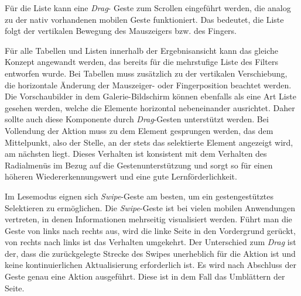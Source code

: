 Für die Liste kann eine \textit{Drag}- Geste zum Scrollen eingeführt werden, die analog zu der nativ vorhandenen mobilen Geste funktioniert. Das bedeutet, die Liste folgt der vertikalen Bewegung des Mauszeigers bzw. des Fingers.\par
{}
Für alle Tabellen und Listen innerhalb der Ergebnisansicht kann das gleiche Konzept angewandt werden, das bereits für die mehrstufige Liste des Filters entworfen wurde. Bei Tabellen muss zusätzlich zu der vertikalen Verschiebung, die horizontale Änderung der Mauszeiger- oder Fingerposition beachtet werden. Die Vorschaubilder in dem Galerie-Bildschirm können ebenfalls als eine Art Liste gesehen werden, welche die Elemente horizontal nebeneinander ausrichtet. Daher sollte auch diese Komponente durch \textit{Drag}-Gesten unterstützt werden. Bei Vollendung der Aktion muss zu dem Element gesprungen werden, das dem Mittelpunkt, also der Stelle, an der stets das selektierte Element angezeigt wird, am nächsten liegt. Dieses Verhalten ist konsistent mit dem Verhalten des Radialmenüs im Bezug auf die Gestenunterstützung und sorgt so für einen höheren Wiedererkennungswert und eine gute Lernförderlichkeit.\par
Im Lesemodus eignen sich \textit{Swipe}-Geste am besten, um ein gestengestütztes Selektieren zu ermöglichen. Die \textit{Swipe}-Geste ist bei vielen mobilen Anwendungen vertreten, in denen Informationen mehrseitig visualisiert werden. Führt man die Geste von links nach rechts aus, wird die linke Seite in den Vordergrund gerückt, von rechts nach links ist das Verhalten umgekehrt. Der Unterschied zum \textit{Drag} ist der, dass die zurückgelegte Strecke des Swipes unerheblich für die Aktion ist und keine kontinuierlichen Aktualisierung erforderlich ist. Es wird nach Abschluss der Geste genau eine Aktion ausgeführt. Diese ist in dem Fall das Umblättern der Seite.\par
